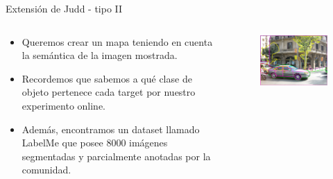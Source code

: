 \documentclass[compress]{beamer}
\begin{document}
\begin{frame}{Extensión de Judd - tipo II}

  \begin{columns}[T]
    \begin{column}{.65\textwidth}
        \begin{itemize}
        \item Queremos crear un mapa teniendo en cuenta la semántica de la imagen mostrada.
        \item Recordemos que sabemos a qué clase de objeto pertenece cada target por nuestro experimento online. 
        \item Además, encontramos un dataset llamado LabelMe que posee 8000 imágenes segmentadas y parcialmente anotadas por la comunidad.
        \end{itemize}
    \end{column}
    \begin{column}{.35\textwidth}
        \begin{figure}
        \begin{center}
        \includegraphics[width=\textwidth]{images/label-me-example.png} 
        \end{center}
        \end{figure}
    \end{column}
  \end{columns}

\end{frame}
\end{document}
